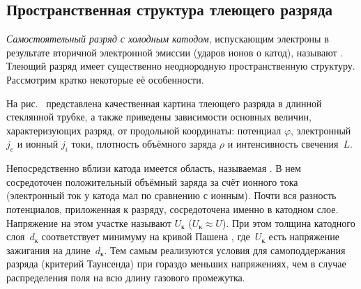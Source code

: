 \subsection*{Пространственная структура тлеющего разряда}

\emph{Самостоятельный разряд с холодным катодом}, испускающим электроны
в результате вторичной электронной эмиссии 
(ударов ионов о катод), называют .
Тлеющий разряд имеет существенно неоднородную пространственную структуру. 
Рассмотрим кратко некоторые её особенности.

На рис.~ представлена качественная картина тлеющего
разряда в длинной стеклянной трубке, а также приведены зависимости
основных величин, характеризующих разряд, от продольной координаты:
потенциал $\varphi$, электронный $j_e$ и ионный $j_i$ токи,
плотность объёмного заряда $\rho$ и интенсивность свечения~$L$.

Непосредственно вблизи катода имеется область, называемая .
В нем сосредоточен положительный объёмный заряда за счёт
ионного тока (электронный ток у катода мал по сравнению с ионным).
Почти вся разность потенциалов, приложенная к разряду, 
сосредоточена именно в катодном слое.
Напряжение на этом участке называют
 $U_{к}$ ($U_{к} \approx U$).
При этом толщина катодного слоя~$d_{к}$ соответствует минимуму на кривой
Пашена , где~$U_{к}$ есть напряжение зажигания
на длине~$d_{к}$. Тем самым реализуются условия для самоподдержания разряда
(критерий Таунсенда) при гораздо меньших напряжениях, 
чем в случае распределения поля на всю длину газового промежутка.

